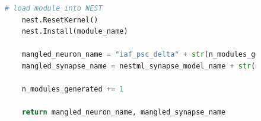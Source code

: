 \begin{figure}[ht!]
\begin{lstlisting}[language=Python, label=lst:generating_code]
    # load module into NEST
    nest.ResetKernel()
    nest.Install(module_name)

    mangled_neuron_name = "iaf_psc_delta" + str(n_modules_generated) + "_nestml__with_" + nestml_synapse_model_name + str(n_modules_generated) + "_nestml"
    mangled_synapse_name = nestml_synapse_model_name + str(n_modules_generated) + "_nestml__with_iaf_psc_delta" + str(n_modules_generated) + "_nestml"

    n_modules_generated += 1

    return mangled_neuron_name, mangled_synapse_name
\end{lstlisting}

\end{figure}

\clearpage


